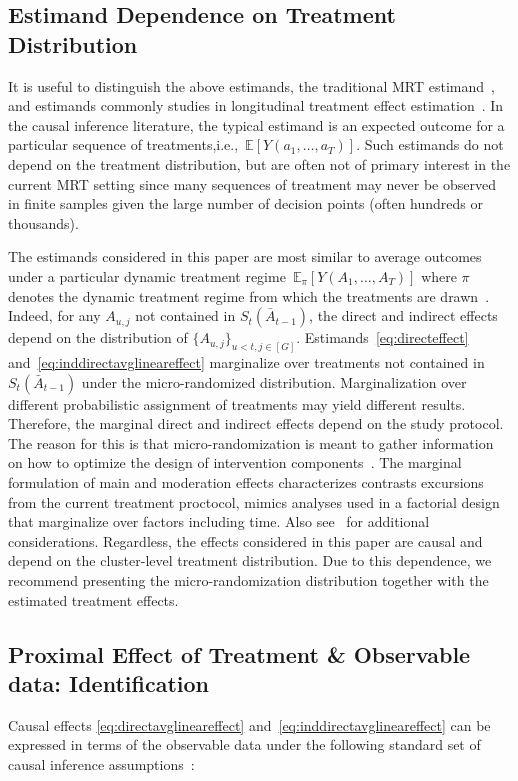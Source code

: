 \documentclass[12pt]{article}
\def\E{\mathbb{E}}
\begin{document}
\subsection{Estimand Dependence on Treatment Distribution}

It is useful to distinguish the above estimands, the traditional MRT estimand~\citep{Boruvkaetal}, and estimands commonly studies in longitudinal treatment effect estimation~\citep{Robins}. In the causal inference literature, the typical estimand is an expected outcome for a particular sequence of treatments,i.e.,~$\E \left[ Y(a_1,\ldots, a_T)\right]$.  Such estimands do not depend on the treatment distribution, but are often not of primary interest in the current MRT setting since many sequences of treatment may never be observed in finite samples given the large number of decision points (often hundreds or thousands).

The estimands considered in this paper are most similar to average outcomes under a particular dynamic treatment regime~$\E_\pi \left[ Y(A_1,\ldots, A_T)\right]$ where $\pi$ denotes the dynamic treatment regime from which the treatments are drawn~\citep{MurphyJASA2001}. Indeed, for any $A_{u,j}$ not contained in $S_t (\bar A_{t-1})$, the direct and indirect effects depend on the distribution of $\{ A_{u,j} \}_{u < t, j \in [G]}$.  Estimands~\eqref{eq:directeffect} and~\eqref{eq:inddirectavglineareffect} marginalize over treatments not contained in $S_t(\bar A_{t-1})$ under the micro-randomized distribution.  Marginalization over different probabilistic assignment of treatments may yield different results. Therefore, the marginal direct and indirect effects depend on the study protocol. The reason for this is that micro-randomization is meant to gather information on how to optimize the design of intervention components~\citep{Collins2018}.  The marginal formulation of main and moderation effects characterizes contrasts excursions from the current treatment proctocol, mimics analyses used in a factorial design that marginalize over factors including time. Also see~\citet[Section 8]{Qian2021} for additional considerations.  Regardless, the effects considered in this paper are causal and depend on the cluster-level treatment distribution.  Due to this dependence, we recommend presenting the micro-randomization distribution together with the estimated treatment effects.

\subsection{Proximal Effect of Treatment \& Observable data: Identification}
\label{section:prox_effects_data}
Causal effects \eqref{eq:directavglineareffect} and~\eqref{eq:inddirectavglineareffect} can be expressed in terms of the observable data under the following standard set of causal inference assumptions~\cite{Robins}:
\end{document}

